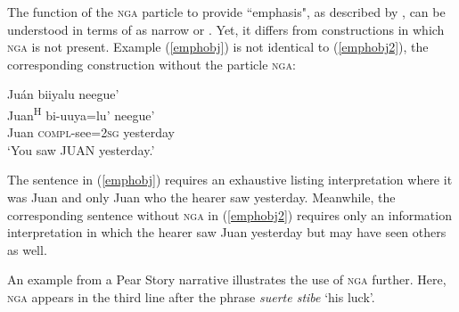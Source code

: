 \z
The function of the \textsc{nga} particle to provide ``emphasis", as described by \citet{pickett1998}, can be understood in terms of \citet{lambrecht1994} as narrow or . Yet, it differs from  constructions in which \textsc{nga} is not present. Example (\ref{emphobj}) is not identical to (\ref{emphobj2}), the corresponding  construction without the particle \textsc{nga}:

\ea\label{emphobj2}
\glll Ju\'{a}n biiyalu neegue' \\
Juan\textsuperscript{H} bi-uuya=lu' neegue' \\
Juan \textsc{compl}-see=2\textsc{sg} yesterday \\
\glt `You saw JUAN yesterday.'

\z
The sentence in (\ref{emphobj}) requires an exhaustive listing interpretation where it was Juan and only Juan who the hearer saw yesterday. Meanwhile, the corresponding sentence without \textsc{nga} in (\ref{emphobj2}) requires only an information  interpretation in which the hearer saw Juan yesterday but may have seen others as well.


An example from a Pear Story narrative illustrates the use of \textsc{nga} further. Here, \textsc{nga} appears in the third line after the phrase \textit{suerte stibe} `his luck'.

